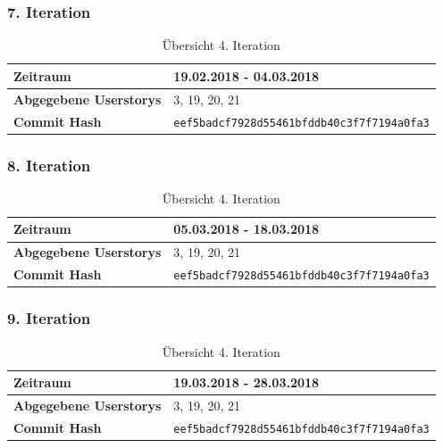 \documentclass[accentcolor=tud9c,12pt,paper=a4]{tudreport}
\begin{document}
	\subsubsection{7. Iteration}
	\begin{table}[H]
	\begin{center}
		\begin{tabular}{| l | l |}
			\hline
			\textbf{Zeitraum} &  19.02.2018 - 04.03.2018\\\hline
			\textbf{Abgegebene Userstorys} & 3, 19, 20, 21\\\hline
			\textbf{Commit Hash} & \texttt{eef5badcf7928d55461bfddb40c3f7f7194a0fa3} \\\hline
		\end{tabular}
		\caption{Übersicht 4. Iteration}
	\end{center}
	\end{table}

	\subsubsection{8. Iteration}
	\begin{table}[H]
	\begin{center}
		\begin{tabular}{| l | l |}
			\hline
			\textbf{Zeitraum} &  05.03.2018 - 18.03.2018\\\hline
			\textbf{Abgegebene Userstorys} & 3, 19, 20, 21\\\hline
			\textbf{Commit Hash} & \texttt{eef5badcf7928d55461bfddb40c3f7f7194a0fa3} \\\hline
		\end{tabular}
		\caption{Übersicht 4. Iteration}
	\end{center}
	\end{table}

	\subsubsection{9. Iteration}
	\begin{table}[H]
	\begin{center}
		\begin{tabular}{| l | l |}
			\hline
			\textbf{Zeitraum} &  19.03.2018 - 28.03.2018\\\hline
			\textbf{Abgegebene Userstorys} & 3, 19, 20, 21\\\hline
			\textbf{Commit Hash} & \texttt{eef5badcf7928d55461bfddb40c3f7f7194a0fa3} \\\hline
		\end{tabular}
		\caption{Übersicht 4. Iteration}
	\end{center}
	\end{table}
\end{document}
